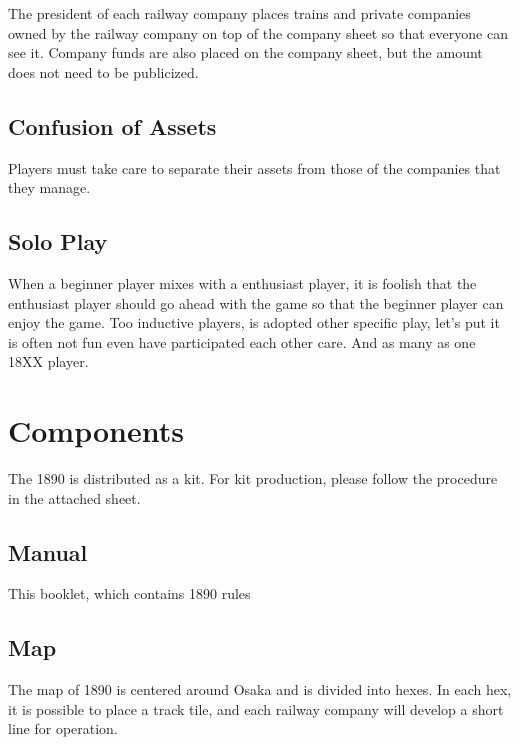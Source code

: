 \documentclass{article}
\begin{document}
\begin{CJK}{UTF8}{min}
\begin{multicols}{2}
The president of each railway company places trains and private
companies owned by the railway company on top of the company sheet so
that everyone can see it. Company funds are also placed on the company
sheet, but the amount does not need to be publicized.


\subsection{Confusion of Assets}
Players must take care to separate their assets from those of the
companies that they manage.


\subsection{Solo Play}

When a beginner player mixes with a enthusiast player, it is foolish
that the enthusiast player should go ahead with the game so that the
beginner player can enjoy the game. Too inductive players, is adopted
other specific play, let's put it is often not fun even have
participated each other care. And as many as one 18XX player.

\section{Components}

The 1890 is distributed as a kit. For kit production, please follow
the procedure in the attached sheet.

\subsection{Manual}

This booklet, which contains 1890 rules

\subsection{Map}

The map of 1890 is centered around Osaka and is divided into
hexes. In each hex, it is possible to place a track tile, and each
railway company will develop a short line for operation.


\end{multicols}
\end{CJK}
\end{document}
